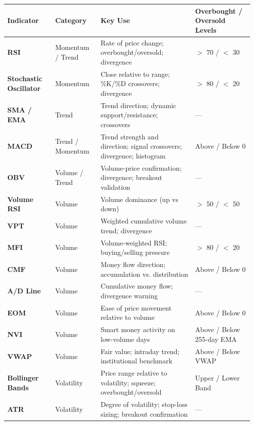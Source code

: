 \documentclass[12pt,openany]{book}
\begin{document}
\begin{center}
\scriptsize
\renewcommand{\arraystretch}{1.2}
\begin{tabular}{|L{0.13\textwidth}|L{0.18\textwidth}|L{0.36\textwidth}|L{0.14\textwidth}|}
\hline
 \textbf{Indicator} & \textbf{Category} & \textbf{Key Use} & \textbf{Overbought / Oversold Levels} \\ \hline
 \textbf{RSI} & Momentum / Trend & Rate of price change; overbought/oversold; divergence & \(>\) 70 / \(<\) 30 \\ \hline
 \textbf{Stochastic Oscillator} & Momentum & Close relative to range; \%K/\%D crossovers; divergence & \(>\) 80 / \(<\) 20 \\ \hline
 \textbf{SMA / EMA} & Trend & Trend direction; dynamic support/resistance; crossovers & --- \\ \hline
 \textbf{MACD} & Trend / Momentum & Trend strength and direction; signal crossovers; divergence; histogram & Above / Below 0 \\ \hline
 \textbf{OBV} & Volume / Trend & Volume-price confirmation; divergence; breakout validation & --- \\ \hline
 \textbf{Volume RSI} & Volume & Volume dominance (up vs down) & \(>\) 50 / \(<\) 50 \\ \hline
 \textbf{VPT} & Volume & Weighted cumulative volume trend; divergence & --- \\ \hline
 \textbf{MFI} & Volume & Volume-weighted RSI; buying/selling pressure & \(>\) 80 / \(<\) 20 \\ \hline
 \textbf{CMF} & Volume & Money flow direction; accumulation vs. distribution & Above / Below 0 \\ \hline
 \textbf{A/D Line} & Volume & Cumulative money flow; divergence warning & --- \\ \hline
 \textbf{EOM} & Volume & Ease of price movement relative to volume & Above / Below 0 \\ \hline
 \textbf{NVI} & Volume & Smart money activity on low-volume days & Above / Below 255-day EMA \\ \hline
 \textbf{VWAP} & Volume & Fair value; intraday trend; institutional benchmark & Above / Below VWAP \\ \hline
 \textbf{Bollinger Bands} & Volatility & Price range relative to volatility; squeeze; overbought/oversold & Upper / Lower Band \\ \hline
 \textbf{ATR} & Volatility & Degree of volatility; stop-loss sizing; breakout confirmation & --- \\ \hline
\end{tabular}
\end{center}
\end{document}

